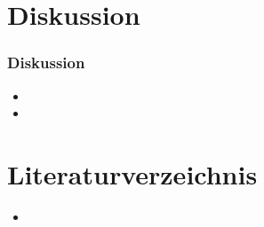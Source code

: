 \documentclass{beamer}
\begin{document}
\section{Diskussion}
\frame
{
  \frametitle{Diskussion}
  
  \begin{itemize}
  \item<1-> 
  \item<2-> 
   \end{itemize}
}

\begingroup
\scriptsize
\section{Literaturverzeichnis}
\frame
{
\begin{itemize}
\item 


\end{itemize}
}


\endgroup
\end{document}
